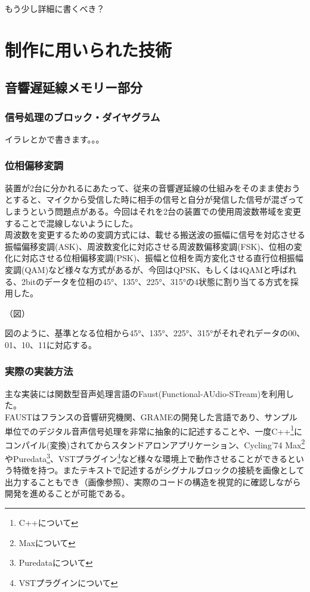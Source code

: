 もう少し詳細に書くべき？

\section{制作に用いられた技術}\label{ux5236ux4f5cux306bux7528ux3044ux3089ux308cux305fux6280ux8853}

\subsection{音響遅延線メモリー部分}\label{ux97f3ux97ffux9045ux5ef6ux7ddaux30e1ux30e2ux30eaux30fcux90e8ux5206}

\subsubsection{信号処理のブロック・ダイヤグラム}\label{ux4fe1ux53f7ux51e6ux7406ux306eux30d6ux30edux30c3ux30afux30c0ux30a4ux30e4ux30b0ux30e9ux30e0}

イラレとかで書きます。。。

\subsubsection{位相偏移変調}\label{ux4f4dux76f8ux504fux79fbux5909ux8abf}

装置が2台に分かれるにあたって、従来の音響遅延線の仕組みをそのまま使おうとすると、マイクから受信した時に相手の信号と自分が発信した信号が混ざってしまうという問題点がある。今回はそれを2台の装置での使用周波数帯域を変更することで混線しないようにした。\\
周波数を変更するための変調方式には、載せる搬送波の振幅に信号を対応させる振幅偏移変調(ASK)、周波数変化に対応させる周波数偏移変調(FSK)、位相の変化に対応させる位相偏移変調(PSK)、振幅と位相を両方変化させる直行位相振幅変調(QAM)など様々な方式があるが、今回はQPSK、もしくは4QAMと呼ばれる、2bitのデータを位相の45°、135°、225°、315°の4状態に割り当てる方式を採用した。

（図）

図のように、基準となる位相から45°、135°、225°、315°がそれぞれデータの00、01、10、11に対応する。

\subsubsection{実際の実装方法}\label{ux5b9fux969bux306eux5b9fux88c5ux65b9ux6cd5}

主な実装には関数型音声処理言語のFaust(Functional-AUdio-STream)を利用した。\\
FAUSTはフランスの音響研究機関、GRAMEの開発した言語であり、サンプル単位でのデジタル音声信号処理を非常に抽象的に記述することや、一度C++\footnote{C++について}にコンパイル(変換)されてからスタンドアロンアプリケーション、Cycling'74
Max\footnote{Maxについて}やPuredata\footnote{Puredataについて}、VSTプラグイン\footnote{VSTプラグインについて}など様々な環境上で動作させることができるという特徴を持つ。またテキストで記述するがシグナルブロックの接続を画像として出力することもでき（画像参照）、実際のコードの構造を視覚的に確認しながら開発を進めることが可能である。

